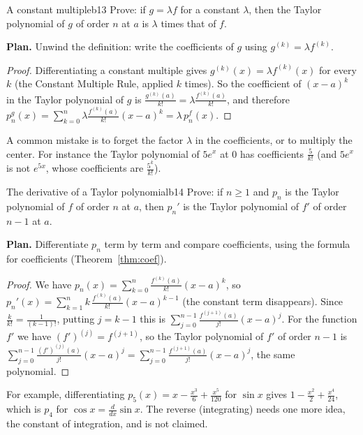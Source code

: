 \documentclass[11pt]{article}
\begin{document}
\begin{exmp}{A constant multiple}{b13}
Prove: if $g=\lambda f$ for a constant $\lambda$, then the Taylor polynomial of $g$ of order $n$ at $a$ is $\lambda$ times that of $f$.

\textbf{Plan.} Unwind the definition: write the coefficients of $g$ using $g^{(k)}=\lambda f^{(k)}$.

\begin{proof}
Differentiating a constant multiple gives $g^{(k)}(x)=\lambda f^{(k)}(x)$ for every $k$ (the Constant Multiple Rule, applied $k$ times). So the coefficient of $(x-a)^k$ in the Taylor polynomial of $g$ is $\frac{g^{(k)}(a)}{k!}=\lambda\frac{f^{(k)}(a)}{k!}$, and therefore $p_n^{g}(x)=\sum_{k=0}^n\lambda\frac{f^{(k)}(a)}{k!}(x-a)^k=\lambda\,p_n^{f}(x)$.
\end{proof}
A common mistake is to forget the factor $\lambda$ in the coefficients, or to multiply the center. For instance the Taylor polynomial of $5e^x$ at $0$ has coefficients $\frac5{k!}$ (and $5e^x$ is not $e^{5x}$, whose coefficients are $\frac{5^k}{k!}$).
\end{exmp}

\begin{exmp}{The derivative of a Taylor polynomial}{b14}
Prove: if $n\ge1$ and $p_n$ is the Taylor polynomial of $f$ of order $n$ at $a$, then $p_n'$ is the Taylor polynomial of $f'$ of order $n-1$ at $a$.

\textbf{Plan.} Differentiate $p_n$ term by term and compare coefficients, using the formula for coefficients (Theorem~\ref{thm:coef}).

\begin{proof}
We have $p_n(x)=\sum_{k=0}^n\frac{f^{(k)}(a)}{k!}(x-a)^k$, so $p_n'(x)=\sum_{k=1}^nk\,\frac{f^{(k)}(a)}{k!}(x-a)^{k-1}$ (the constant term disappears). Since $\frac k{k!}=\frac1{(k-1)!}$, putting $j=k-1$ this is $\sum_{j=0}^{n-1}\frac{f^{(j+1)}(a)}{j!}(x-a)^j$. For the function $f'$ we have $(f')^{(j)}=f^{(j+1)}$, so the Taylor polynomial of $f'$ of order $n-1$ is $\sum_{j=0}^{n-1}\frac{(f')^{(j)}(a)}{j!}(x-a)^j=\sum_{j=0}^{n-1}\frac{f^{(j+1)}(a)}{j!}(x-a)^j$, the same polynomial.
\end{proof}
For example, differentiating $p_5(x)=x-\frac{x^3}6+\frac{x^5}{120}$ for $\sin x$ gives $1-\frac{x^2}2+\frac{x^4}{24}$, which is $p_4$ for $\cos x=\frac d{dx}\sin x$. The reverse (integrating) needs one more idea, the constant of integration, and is not claimed.
\end{exmp}
\end{document}
